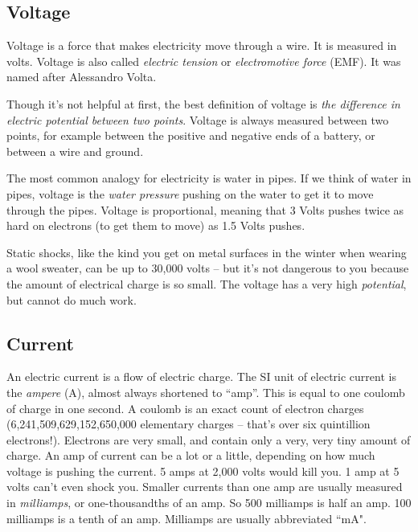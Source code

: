 
\subsection*{Voltage}

Voltage is a force that makes electricity move through a wire. It is measured in volts. Voltage is also called \emph{electric tension} or \emph{electromotive force} (EMF). It was named after Alessandro Volta.

Though it's not helpful at first, the best definition of voltage is \emph{the difference in electric potential between two points}. Voltage is always measured between two points, for example between the positive and negative ends of a battery, or between a wire and ground.

The most common analogy for electricity is water in pipes. If we think of water in pipes, voltage is the \emph{water pressure} pushing on the water to get it to move through the pipes. Voltage is proportional, meaning that 3 Volts pushes twice as hard on electrons (to get them to move) as 1.5 Volts pushes.

Static shocks, like the kind you get on metal surfaces in the winter when wearing a wool sweater, can be up to 30,000 volts -- but it's not dangerous to you because the amount of electrical charge is so small. The voltage has a very high \emph{potential}, but cannot do much work.

\bigskip



\subsection*{Current}

An electric current is a flow of electric charge. The SI unit of electric current is the \emph{ampere} (A), almost always shortened to ``amp''. This is equal to one coulomb of charge in one second. A coulomb is an exact count of electron charges (6,241,509,629,152,650,000 elementary charges -- that's over six quintillion electrons!). Electrons are very small, and contain only a very, very tiny amount of charge. An amp of current can be a lot or a little, depending on how much voltage is pushing the current. 5 amps at 2,000 volts would kill you. 1 amp at 5 volts can't even shock you. Smaller currents than one amp are usually measured in \emph{milliamps}, or one-thousandths of an amp. So 500 milliamps is half an amp. 100 milliamps is a tenth of an amp. Milliamps are usually abbreviated ``mA".


